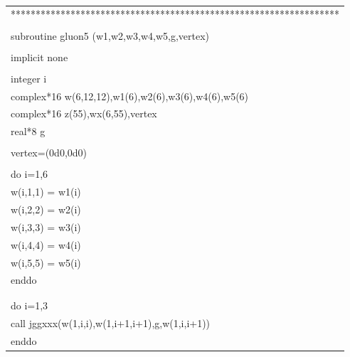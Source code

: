 \documentclass[a4paper,11pt]{article}
\begin{document}
\begin{center}
\vspace{3em}
\small
{\tt
\begin{supertabular}{l}
******************************************************************\\\\
      \hspace{0.5em} subroutine gluon5 (w1,w2,w3,w4,w5,g,vertex)\\
\\
     \hspace{0.5em} implicit none\\
\\
     \hspace{0.5em} integer i\\
     \hspace{0.5em} complex*16 w(6,12,12),w1(6),w2(6),w3(6),w4(6),w5(6)\\
     \hspace{0.5em} complex*16 z(55),wx(6,55),vertex    \\
     \hspace{0.5em} real*8 g    \\
      \\
     \hspace{0.5em} vertex=(0d0,0d0)     \\
\\
     \hspace{0.5em} do i=1,6\\
     \hspace{1em}    w(i,1,1) = w1(i)\\
     \hspace{1em}    w(i,2,2) = w2(i)\\
     \hspace{1em}    w(i,3,3) = w3(i)\\
     \hspace{1em}    w(i,4,4) = w4(i)\\
     \hspace{1em}    w(i,5,5) = w5(i)\\
     \hspace{0.5em} enddo\\
\\\\
     \hspace{0.5em} do i=1,3\\
     \hspace{1em} call jggxxx(w(1,i,i),w(1,i+1,i+1),g,w(1,i,i+1))     \\
     \hspace{0.5em} enddo\\

\end{supertabular}}
\end{center}
\end{document}
